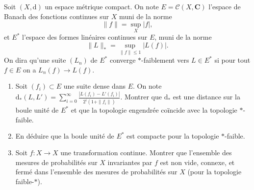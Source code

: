 \documentclass[a4paper,10pt,openany]{article}
\theoremstyle{plain}
\theoremstyle{definition}
\newcommand{\dd}{\mathrm{d}}
\newcommand{\C}{\mathbf{C}}
\begin{document}
 \vspace{1.5mm} 

\noindent Soit $(X, \dd)$ un espace m\'etrique compact. On note $E = \mathcal{C}(X,\C)$ l'espace de Banach des fonctions continues sur $X$ muni de la norme
$$
\| f \| = \sup_{X} |f|,
$$
et $E^*$ l'espace des formes lin\'eaires continues sur $E$, muni de la norme 
$$
\|L\|_* = \sup_{\| f \| \leq 1} |L(f)|. 
$$
On dira qu'une suite $(L_n)$ de $E^*$ converge $*$-faiblement vers $L \in E^*$ si pour tout $f \in E$ on a $L_n(f) \to L(f)$.
\begin{enumerate}
\item Soit $(f_i) \subset E$ une suite dense dans $E$. On note $\displaystyle{\dd_*(L,L') = \sum_{i=0}^\infty \frac{|L(f_i)-L'(f_i)|}{2^i (1+\|f_i\|)}}$. Montrer que $\dd_*$ est une distance sur la boule unit\'e de $E^*$ et que la topologie engendr\'ee co\"incide avec la topologie $*$-faible.
\item En d\'eduire que la boule unit\'e de $E^*$ est compacte pour la topologie $*$-faible.
\item Soit $f : X \to X$ une transformation continue. Montrer que l'ensemble des mesures de probabilit\'es sur $X$ invariantes par $f$ est non vide, connexe, et ferm\'e dans l'ensemble des mesures de probabilit\'es sur $X$ (pour la topologie faible-$*$).
\end{enumerate}
\vspace{0.6cm}

 \vspace{1.5mm} 
\end{document}
